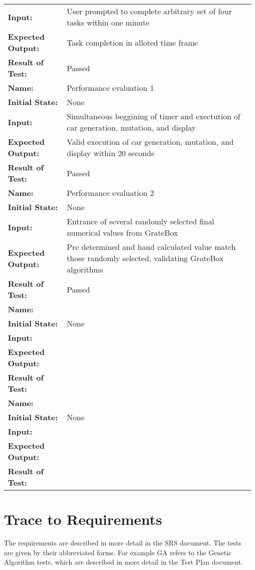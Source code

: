 \documentclass[12pt, titlepage]{article}
\begin{document}
\begin{center}
\begin{longtable}{ l | p{10cm} }
\textbf{Input:} & User prompted to complete arbitrary set of four tasks within one minute\\
\textbf{Expected Output:} & Task completion in alloted time frame\\[0.6em]
\textbf{Result of Test:} & Passed\\
\hline
\rule{0pt}{1.5em}\textbf{Name:} & Performance evaluation 1\\
\textbf{Initial State:} & None\\
\textbf{Input:} & Simultaneous beggining of timer and exectution of car generation, mutation, and display\\
\textbf{Expected Output:} & Valid execution of car generation, mutation, and display within 20 seconds\\[0.6em]
\textbf{Result of Test:} & Passed\\
\hline
\rule{0pt}{1.5em}\textbf{Name:} & Performance evaluation 2\\
\textbf{Initial State:} & None\\
\textbf{Input:} & Entrance of several randomly selected final numerical values from GrateBox\\
\textbf{Expected Output:} & Pre determined and hand calculated value match those randomly selected, validating GrateBox algorithms\\[0.6em]
\textbf{Result of Test:} & Passed\\
\hline
\rule{0pt}{1.5em}\textbf{Name:} & \\
\textbf{Initial State:} & None\\
\textbf{Input:} & \\
\textbf{Expected Output:} & \\[0.6em]
\textbf{Result of Test:} & \\
\hline
\rule{0pt}{1.5em}\textbf{Name:} & \\
\textbf{Initial State:} & None\\
\textbf{Input:} & \\
\textbf{Expected Output:} & \\[0.6em]
\textbf{Result of Test:} & \\
\end{longtable}
\end{center}

\section{Trace to Requirements}

The requirements are described in more detail in the SRS document. The tests are 
given by their abbreviated forms. For example GA refers to the Genetic Algorithm 
tests, which are described in more detail in the Test Plan document.
		
\end{document}
